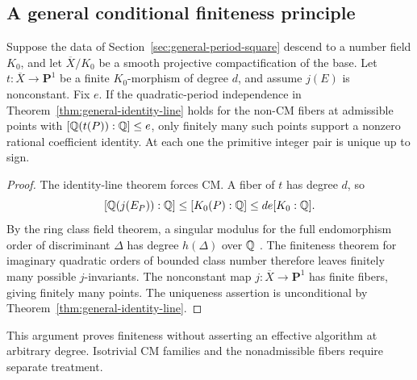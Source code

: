 \subsection{A general conditional finiteness principle}
\begin{theorem}\label{thm:general-finiteness}
Suppose the data of Section~\ref{sec:general-period-square} descend
to a number field $K_0$, and let $\overline X/K_0$ be a smooth
projective compactification of the base. Let
$t:\overline X\to\mathbf P^1$ be a finite $K_0$-morphism of degree $d$, and
assume $j(E)$ is nonconstant. Fix $e$. If the quadratic-period
independence in Theorem~\ref{thm:general-identity-line} holds for
the non-CM fibers at admissible points with
$[\mathbb Q(t(P)):\mathbb Q]\le e$, only finitely many such points support a
nonzero rational coefficient identity. At each one the primitive
integer pair is unique up to sign.
\end{theorem}
\begin{proof}
The identity-line theorem forces CM. A fiber of $t$ has degree
$d$, so
\[
 [\mathbb Q(j(E_P)):\mathbb Q]\le[K_0(P):\mathbb Q]
                       \le de[K_0:\mathbb Q].
\]
By the ring class field theorem, a singular modulus for the full
endomorphism order of discriminant $\Delta$ has degree
$h(\Delta)$ over $\mathbb Q$ \cite{CoxCM}. The finiteness theorem for
imaginary quadratic orders of bounded class number therefore
leaves finitely many possible $j$-invariants. The nonconstant map
$j:\overline X\to\mathbf P^1$ has finite fibers, giving finitely
many points. The uniqueness assertion is unconditional by
Theorem~\ref{thm:general-identity-line}.
\end{proof}
This argument proves finiteness without asserting an effective
algorithm at arbitrary degree. Isotrivial CM families and the
nonadmissible fibers require separate treatment.
